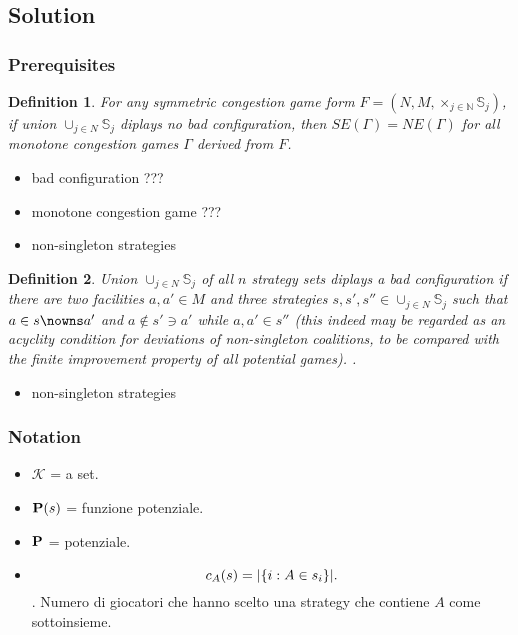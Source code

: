 \documentclass{article}
\newtheorem{defn}{Definition}
\begin{document}
\subsection{Solution}
\subsubsection{Prerequisites}

\begin{defn}
	For any \emph{symmetric congestion game form} $F = (N, M, \times_{j \in \mathbb{N}} \mathbb{S}_j )$, if union $\cup_{j \in N} \mathbb{S}_j$ diplays no bad configuration, then $SE(\Gamma) = NE(\Gamma)$ for all monotone congestion games $\Gamma$ derived from $F$.
\end{defn}
\begin{itemize}
	\item bad configuration ???
	\item monotone congestion game ???
	\item non-singleton strategies
\end{itemize}

\begin{defn}
	Union $\cup_{j \in N} \mathbb{S}_j$ of all $n$ strategy sets diplays a \emph{bad configuration} if there are two facilities $a, a' \in M$ and three strategies $s, s', s'' \in \cup_{j \in N} \mathbb{S}_j$ such that $a \in s \nowns a'$ and $a \not\in s' \owns a'$ while $a, a' \in s''$ (this indeed may be regarded as an acyclity condition for deviations of non-singleton coalitions, to be compared with the finite improvement property of all potential games). \cite{rossi01}.
\end{defn}
\begin{itemize}
	\item non-singleton strategies
\end{itemize}

\subsubsection{Notation}
\begin{itemize}
	\item $\mathcal{K}$ = a set.
	\item $\textbf P(s)$ = funzione potenziale.
	\item $\textbf P$ = potenziale.
	\item $$c_A(s)=|\{i:A\in s_i\}|\text .$$. Numero di giocatori che hanno scelto una strategy che contiene $A$ come sottoinsieme.
\end{itemize}
\end{document}
